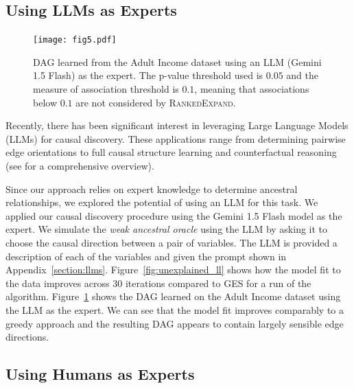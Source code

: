 \documentclass[accepted]{uai2025} %
\begin{document}
\subsection{Using LLMs as Experts}
 
\begin{figure}[t!]
	\centering
	\texttt{[image: fig5.pdf]}
	\caption{DAG learned from the Adult Income dataset using an LLM
		(Gemini 1.5 Flash) as the expert. The p-value threshold used is $ 0.05 $ 
		and the measure of association threshold is $ 0. 1 $, meaning
		that associations below $0.1$ are not considered by 
		\textsc{RankedExpand}.}
	\label{fig:adult_llm}
\end{figure}

Recently, there has been significant interest in leveraging Large Language
Models (LLMs) for causal discovery. These applications range from determining
pairwise edge orientations \citep{Kiciman2023, Jin2024} to full causal
structure learning \citep{Naik2023, Vashishtha2023} and counterfactual
reasoning \citep{Kiciman2023} (see \citet{Liu2024} for a comprehensive
overview).

Since our approach relies on expert knowledge to determine ancestral relationships,
we explored the potential of using an LLM for this task. We applied our causal
discovery procedure using the Gemini 1.5 Flash model as the expert. We simulate
the \emph{weak ancestral oracle} using the LLM by asking it to choose the
causal direction between a pair of variables. The LLM is provided a description
of each of the variables and given the prompt shown in
Appendix~\ref{section:llms}. 
Figure~\ref{fig:unexplained_ll} shows how the model fit to the data improves 
across 30 iterations compared to GES for a run of the algorithm.
Figure~\ref{fig:adult_llm} shows the DAG learned
on the Adult Income dataset using the LLM as the expert. We can see 
that the model fit improves comparably to a greedy approach and 
the resulting DAG appears to contain largely sensible edge directions. 

\subsection{Using Humans as Experts}
\end{document}

